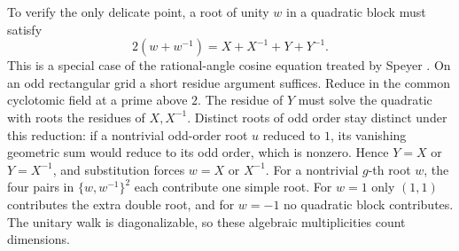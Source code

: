 To verify the only delicate point, a root of unity $w$ in a quadratic
block must satisfy
\[
              2(w+w^{-1})=X+X^{-1}+Y+Y^{-1}.
\]
This is a special case of the rational-angle cosine equation treated by
Speyer \cite{speyer}. On an odd rectangular grid a short residue argument
suffices. Reduce in the common cyclotomic field at a prime above $2$.
The residue of $Y$ must solve the quadratic with roots the residues of
$X,X^{-1}$. Distinct roots of odd order stay distinct under this reduction:
if a nontrivial odd-order root $u$ reduced to $1$, its vanishing geometric
sum would reduce to its odd order, which is nonzero. Hence $Y=X$ or
$Y=X^{-1}$, and substitution forces $w=X$ or $X^{-1}$. For a nontrivial
$g$-th root $w$, the four pairs in $\{w,w^{-1}\}^2$ each contribute one
simple root. For $w=1$ only $(1,1)$ contributes the extra double root,
and for $w=-1$ no quadratic block contributes. The unitary walk is
diagonalizable, so these algebraic multiplicities count dimensions.
